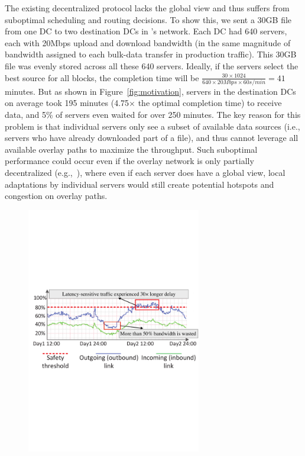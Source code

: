 The existing decentralized protocol lacks the global view and thus
suffers from suboptimal scheduling and routing decisions.
To show this, we sent a 30GB file from one DC to two destination
DCs in \company's network. Each DC had 640 servers, each with 20Mbps
upload and download bandwidth (in the same magnitude of bandwidth
assigned to each bulk-data transfer in production traffic).
This 30GB file was evenly stored across all these 640 servers.
Ideally, if the servers select the best source for all blocks, the
completion time will be
$\frac{30\times 1024}{640\times 20Mbps \times 60s/min} = 41$
minutes. But as shown in Figure~\ref{fig:motivation},
servers in the destination DCs on average took 195 minutes (4.75$\times$
the optimal completion time) to receive data, and 5\% of servers even
waited for over 250 minutes.
The key reason for this problem is that individual servers only see a subset of
available data sources (i.e., servers who have already downloaded part of
a file), and thus cannot leverage all available overlay paths to
maximize the throughput. Such suboptimal performance could occur even if
the overlay network is only partially decentralized (e.g.,~\cite{Huang2014A}),
where even if each server does have a global view, local adaptations by
individual servers would still create potential hotspots and congestion on
overlay paths.


\begin{figure}[t!]
        \center
        \includegraphics[width=3in]{images/nj02-M2A_0212-0216_v3.pdf}
        \label{fig:lesson2}
\vspace{-0.4cm}
\end{figure}

